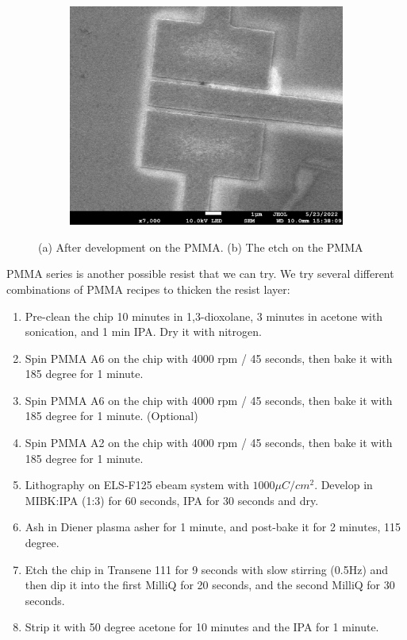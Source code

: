 \begin{figure}[h!]
\begin{subfigure}[b]{0.6\textwidth}
         \caption{}
         \label{}
     \end{subfigure}
     \hfill
     \begin{subfigure}[b]{0.6\textwidth}
         \centering
         \includegraphics[width=\textwidth]{Pic/PMMA_postetch.png}
         \caption{}
         \label{}
     \end{subfigure}
    \caption{(a) After development on the PMMA. (b) The etch on the PMMA}
    \label{TaNWonchip2}
\end{figure}

PMMA series is another possible resist that we can try. We try several different combinations of PMMA recipes to thicken the resist layer:

\begin{enumerate}
    \item Pre-clean the chip 10 minutes in 1,3-dioxolane, 3 minutes in acetone with sonication, and 1 min IPA. Dry it with nitrogen.
    \item Spin PMMA A6 on the chip with 4000 rpm / 45 seconds, then bake it with 185 degree for 1 minute.
    \item Spin PMMA A6 on the chip with 4000 rpm / 45 seconds, then bake it with 185 degree for 1 minute. (Optional)
    \item Spin PMMA A2 on the chip with 4000 rpm / 45 seconds, then bake it with 185 degree for 1 minute.
    \item Lithography on ELS-F125 ebeam system with $1000\mu C  / cm^2$. Develop in MIBK:IPA (1:3) for 60 seconds, IPA for 30 seconds and dry.
    \item Ash in Diener plasma asher for 1 minute, and post-bake it for 2 minutes, 115 degree.
    \item Etch the chip in Transene 111 for 9 seconds with slow stirring (0.5Hz) and then dip it into the first MilliQ for 20 seconds, and the second MilliQ for 30 seconds.
    \item Strip it with 50 degree acetone for 10 minutes and the IPA for 1 minute. 
\end{enumerate}

